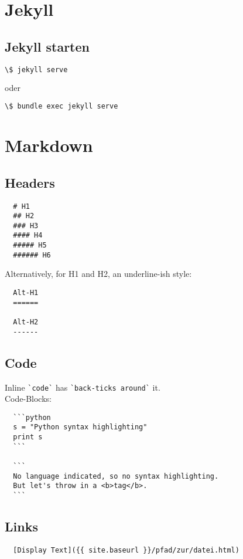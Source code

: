 \documentclass[10pt,landscape,a4paper]{CheatSheet}
\begin{document}
\begin{multicols}{4}
\section{Jekyll}
\subsection{Jekyll starten}
\begin{lstlisting}[language=bash]
\$ jekyll serve
\end{lstlisting}
oder
\begin{lstlisting}[language=bash]
\$ bundle exec jekyll serve
\end{lstlisting}


\section{Markdown}
\subsection{Headers}
\begin{lstlisting}
  # H1
  ## H2
  ### H3
  #### H4
  ##### H5
  ###### H6
\end{lstlisting}  
 Alternatively, for H1 and H2, an underline-ish style:
\begin{lstlisting}
  Alt-H1
  ======
  
  Alt-H2
  ------
\end{lstlisting}
\subsection{Code}
Inline \lstinline{`code`} has \lstinline{`back-ticks around`} it.\\
Code-Blocks:
\begin{lstlisting}
  ```python
  s = "Python syntax highlighting"
  print s
  ```
  
  ```
  No language indicated, so no syntax highlighting. 
  But let's throw in a <b>tag</b>.
  ```
\end{lstlisting}
\subsection{Links}
\begin{lstlisting}
  [Display Text]({{ site.baseurl }}/pfad/zur/datei.html)
\end{lstlisting}
\end{multicols}
\end{document}
